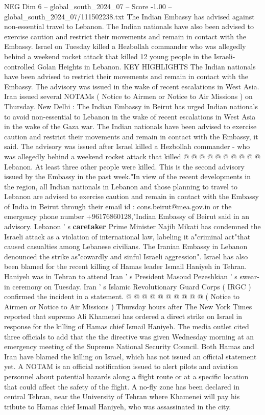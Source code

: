 \begin{textsample}{NEG Dim 6 – global\_south\_2024\_07 – Score -1.00 – global\_south\_2024\_07/111502238.txt}  \label{ex:f6_neg_135}
The Indian Embassy has advised against non-essential travel to Lebanon.
The Indian nationals have also been advised to exercise caution and restrict their movements and remain in contact with the Embassy.
Israel on Tuesday killed a Hezbollah commander who was allegedly behind a weekend rocket attack that killed 12 young people in the Israeli-controlled Golan Heights in Lebanon.
KEY HIGHLIGHTS The Indian nationals have been advised to restrict their movements and remain in contact with the Embassy.
The advisory was issued in the wake of recent escalations in West Asia.
Iran issued several NOTAMs ( Notice to Airmen or Notice to Air Missions ) on Thursday.
New Delhi : The Indian Embassy in Beirut has urged Indian nationals to avoid non-essential to Lebanon in the wake of recent escalations in West Asia in the wake of the Gaza war.
The Indian nationals have been advised to exercise caution and restrict their movements and remain in contact with the Embassy, it said.
The advisory was issued after Israel killed a Hezbollah commander - who was allegedly behind a weekend rocket attack that killed @ @ @ @ @ @ @ @ @ @ Lebanon.
At least three other people were killed.
This is the second advisory issued by the Embassy in the past week."In view of the recent developments in the region, all Indian nationals in Lebanon and those planning to travel to Lebanon are advised to exercise caution and remain in contact with the Embassy of India in Beirut through their email id : cons.beirut@mea.gov.in or the emergency phone number +96176860128,"Indian Embassy of Beirut said in an advisory.
Lebanon ' s \textbf{caretaker} Prime Minister Najib Mikati has condemned the Israeli attack as a violation of international law, labeling it a"criminal act"that caused casualties among Lebanese civilians.
The Iranian Embassy in Lebanon denounced the strike as"cowardly and sinful Israeli aggression".
Israel has also been blamed for the recent killing of Hamas leader Ismail Haniyeh in Tehran.
Haniyeh was in Tehran to attend Iran ' s President Masoud Pezeshkian ' s swear-in ceremony on Tuesday.
Iran ' s Islamic Revolutionary Guard Corps ( IRGC ) confirmed the incident in a statement. @ @ @ @ @ @ @ @ @ @ ( Notice to Airmen or Notice to Air Missions ) Thursday hours after The New York Times reported that supremo Ali Khamenei has ordered a direct strike on Israel in response for the killing of Hamas chief Ismail Haniyeh.
The media outlet cited three officials to add that the the directive was given Wednesday morning at an emergency meeting of the Supreme National Security Council.
Both Hamas and Iran have blamed the killing on Israel, which has not issued an official statement yet.
A NOTAM is an official notification issued to alert pilots and aviation personnel about potential hazards along a flight route or at a specific location that could affect the safety of the flight.
A no-fly zone has been declared in central Tehran, near the University of Tehran where Khamenei will pay his tribute to Hamas chief Ismail Haniyeh, who was assassinated in the city.

\end{textsample}
